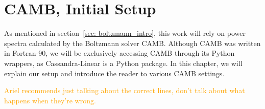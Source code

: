 \chapter{CAMB, Initial Setup}

As mentioned in section~\ref{sec: boltzmann_intro}, this work will rely on
power spectra calculated by the Boltzmann solver CAMB. Although CAMB was
written in Fortran-90, we will be exclusively accessing CAMB through its
Python wrappers, as Cassandra-Linear is a Python package. In this chapter, we will explain our setup and introduce the reader to various CAMB settings.

\begin{comment}
\textcolor{blue}{
I hope to, in painstaking detail, cover many of the lines of the code that I
have written to interface with CAMB. I will include plots to indicate, at
every step, what incorrect settings cause the power spectrum to look like (or,
for subtler errors, what the error curves looked like compared to Ariel's
results, which I treated as a sort of ``ground truth''). This should also be a
good example to flex my physics interpretation skills: why does this incorrect
setting produce this undesired pattern?}

\textcolor{blue}{You might think that this is sort of an inappropriate 
section
for a master's thesis (especially since I have in mind that this be a lengthy 
section), but I would like to include it unless you feel very strongly. After
all, I spent several months of the project debugging at least ten different 
ways that slight and major errors in the various settings led to 
irreconcilable results.}
\end{comment}

\textcolor{orange}{Ariel recommends
just talking about the correct lines, don't talk about what happens when
they're wrong.}

\begin{comment}
In figure \ref{fig: spectrum_type}, we can see that requesting of the wrong
power spectrum type can in some low-$\omega_\nu$ cases yields errors so low
that we might accidentally overlook them. This error pattern is easily
recognizable and is a consequence of the definition of the power spectrum: the
Fourier transform  of the two-point correlation function. ...Okay, I'm still 
thinking about this. I don't understand %
\end{comment}

